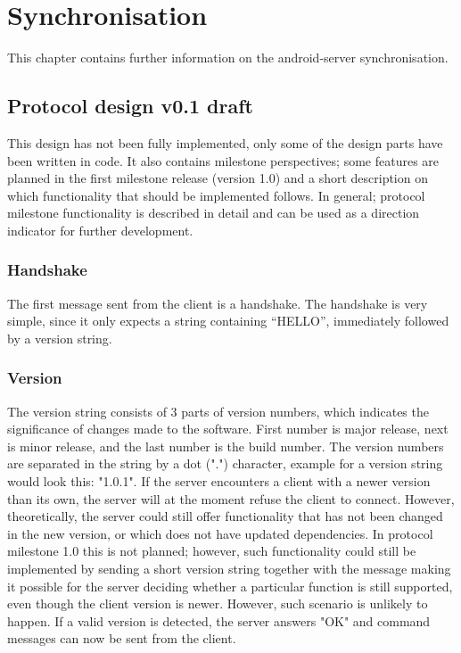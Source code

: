 \chapter{Synchronisation}
This chapter contains further information on the android-server synchronisation. 

\section{Protocol design v0.1 draft}
This design has not been fully implemented, only some of the design parts have been written in code. It also contains milestone perspectives; some features are planned in the first milestone release (version 1.0) and a short description on which functionality that should be implemented follows. In general; protocol milestone functionality is described in detail and can be used as a direction indicator for further development.  

\subsection{Handshake}
The first message sent from the client is a handshake. The handshake is very simple, since it only expects a string containing ``HELLO'', immediately followed by a version string.

\subsection{Version} 
The version string consists of 3 parts of version numbers, which indicates the significance of changes made to the software. First number is major release, next is minor release, and the last number is the build number. The version numbers are separated in the string by a dot (".") character, example for a version string would look this: "1.0.1". If the server encounters a client with a newer version than its own, the server will at the moment refuse the client to connect. However, theoretically, the server could still offer functionality that has not been changed in the new version, or which does not have updated dependencies. In protocol milestone 1.0 this is not planned; however, such functionality could still be implemented by sending a short version string together with the message making it possible for the server deciding whether a particular function is still supported, even though the client version is newer. However, such scenario is unlikely to happen. 
If a valid version is detected, the server answers "OK" and command messages can now be sent from the client.

